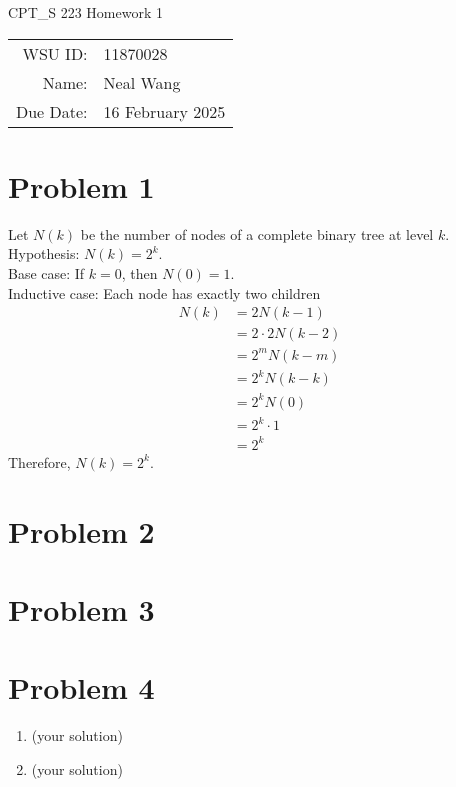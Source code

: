 \documentclass[12pt]{article}
\begin{document}
\begin{center}
  \Large CPT\_S 223 Homework 1
\end{center}

\begin{tabular}{rl}
  WSU ID: & 11870028 \\
  Name: & Neal Wang \\
  Due Date: & 16 February 2025
\end{tabular}

\section*{Problem 1}

Let $N(k)$ be the number of nodes of a complete binary tree at level $k$. \\
Hypothesis: $N(k) = 2^k$. \\
Base case: If $k = 0$, then $N(0) = 1$. \\
Inductive case: Each node has exactly two children
\begin{equation}
  \begin{split}
    N(k) & = 2N(k - 1) \\
    & = 2 \cdot 2N(k - 2) \\
    & = 2^mN(k - m) \\
    & = 2^kN(k - k) \\
    & = 2^kN(0) \\
    & = 2^k \cdot 1 \\
    & = 2^k
  \end{split}
\end{equation}
Therefore, $N(k) = 2^k$.

\section*{Problem 2}

\section*{Problem 3}

\section*{Problem 4}

\begin{enumerate}[label=(\alph*)]
  \item (your solution)
  \item (your solution)
\end{enumerate}
\end{document}
